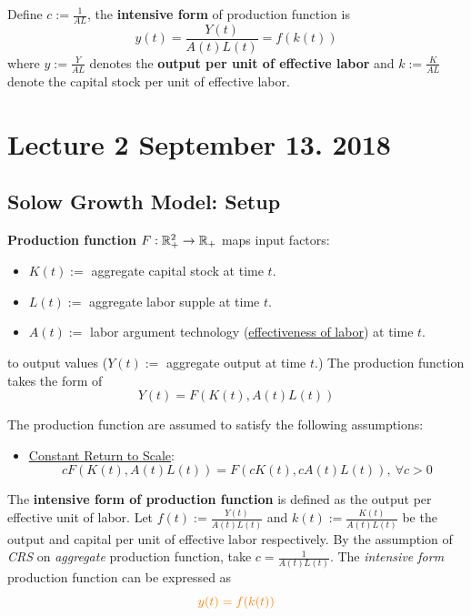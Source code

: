 \documentclass[]{article}
\begin{document}
            \begin{definition}
                Define $c := \frac{1}{AL}$, the \textbf{intensive form} of production function is
                \[
                    y(t) = \frac{Y(t)}{A(t)L(t)} = f(k(t))
                \]
                where $y := \frac{Y}{AL}$ denotes the \textbf{output per unit of effective labor} and $k := \frac{K}{AL}$ denote the capital stock per unit of effective labor.
            \end{definition}
	
	\section{Lecture 2 September 13. 2018}
		\subsection{Solow Growth Model: Setup}
			\begin{definition}
				\textbf{Production function} $F: \mathbb{R}^2_{+} \rightarrow \mathbb{R}_+$ maps input factors:
				\begin{itemize}
					\item $K(t) := $ aggregate capital stock at time $t$.
					\item $L(t) := $ aggregate labor supple at time $t$.
					\item $A(t) := $ labor argument technology (\ul{effectiveness of labor}) at time $t$.
				\end{itemize} 
				to output values ($Y(t) := $ aggregate output at time $t$.) The production function takes the form of
				\[
					Y(t) = F(K(t), A(t)L(t))
				\]
			\end{definition}
			
			\begin{assumption}
				The production function are assumed to satisfy the following assumptions: 
				\begin{itemize}
					\item \ul{Constant Return to Scale}: \[cF(K(t), A(t)L(t)) = F(cK(t), cA(t)L(t)),\ \forall c > 0\]
				\end{itemize}
			\end{assumption}
			
			\begin{definition}
				The \textbf{intensive form of production function} is defined as the output per effective unit of labor. Let $f(t) := \frac{Y(t)}{A(t)L(t)}$ and $k(t) := \frac{K(t)}{A(t)L(t)}$ be the output and capital per unit of effective labor respectively. By the assumption of \emph{CRS} on \emph{aggregate} production function, take $c = \frac{1}{A(t)L(t)}$. The \emph{intensive form} production function can be expressed as
				\begin{equation}
					\textcolor{orange}{
						y(t) = f(k(t))
					}
				\end{equation}
			\end{definition}
			
\end{document}
